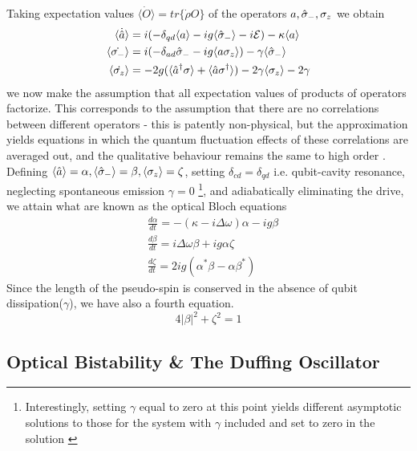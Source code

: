 Taking expectation values $\langle \dot{O} \rangle = tr\{\dot{\rho} O \}$ of the operators $a, \hat{\sigma}_-, \sigma_z$ we obtain
\begin{align}
  \langle \dot{\hat{a}} \rangle & = i(-\delta_{qd}\langle a \rangle - ig \langle \hat{\sigma}_- \rangle -i\mathcal{E}) -\kappa \langle a \rangle \\
  \langle \dot{\sigma_-} \rangle & = i(-\delta_{ad}\hat{\sigma}_- - ig \langle a \sigma_z \rangle) - \gamma \langle \hat{\sigma}_- \rangle \\
  \langle \dot{\sigma_z} \rangle & = -2g ( \langle \hat{a}^\dagger \sigma \rangle + \langle \hat{a} \sigma^\dagger \rangle) - 2 \gamma \langle \sigma_z \rangle - 2 \gamma
\end{align}
we now make the assumption that all expectation values of products of operators factorize. This corresponds to the assumption that there are no correlations between different operators - this is patently non-physical, but the approximation yields equations in which the quantum fluctuation effects of these correlations are averaged out, and the qualitative behaviour remains the same to high order \cite{Jaynes1963a}. Defining $\langle \hat{a} \rangle = \alpha, \langle \hat{\sigma}_- \rangle = \beta, \langle
\sigma_z \rangle = \zeta$, setting $\delta_{cd} = \delta_{qd}$ i.e. qubit-cavity resonance, neglecting spontaneous emission $\gamma=0$ \footnote{ Interestingly, setting $\gamma$ equal to zero at this point yields different asymptotic solutions to those for the system with $\gamma$ included and set to zero in the solution \cite{Alsing1990}}, and adiabatically eliminating the drive, we attain what are known as the optical Bloch equations
\begin{align}
  &\frac{d \alpha}{dt} = -(\kappa -i \Delta \omega) \alpha-ig \beta \label{eq:alpha}\\
  &\frac{d \beta}{dt} = i \Delta \omega \beta +ig \alpha \zeta \label{eq:beta}\\
  &\frac{d \zeta}{dt} = 2 i g(\alpha^* \beta -\alpha \beta^*)\label{eq:zeta}
\end{align}
Since the length of the pseudo-spin is conserved in the absence of qubit dissipation($\gamma$), we have also a fourth equation. 
\begin{equation}
  4|\beta|^2+\zeta^2 = 1 \label{eq:pseudospin}
\end{equation}
\subsection{Optical Bistability \& The Duffing Oscillator}
\cite{Agrawal1979}

